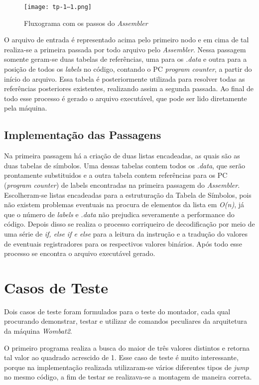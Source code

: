\documentclass{article}
\begin{document}
\begin{figure}[h!]
\centering
\texttt{[image: tp-1--1.png]}
\caption{Fluxograma com os passos do \textit{Assembler}}
\label{fig:trieExample}
\end{figure}

O arquivo de entrada é representado acima pelo primeiro nodo e em cima de tal realiza-se a primeira passada por todo arquivo pelo \textit{Assembler}. Nessa passagem somente geram-se duas tabelas de referências, uma para os \textit{.data} e outra para a posição de todos os \textit{labels} no código, contando o PC \textit{program counter}, a partir do início do arquivo. Essa tabela é posteriormente utilizada para resolver todas as referências posteriores existentes, realizando assim a segunda passada. Ao final de todo esse processo é gerado o arquivo executável, que pode ser lido diretamente pela máquina.

\subsection{Implementação das Passagens}
Na primeira passagem há a criação de duas listas encadeadas, as quais são as duas tabelas de símbolos. Uma dessas tabelas contem todos os \textit{.data}, que serão prontamente substituidos e a outra tabela contem referências para os PC (\textit{program counter}) de labels encontradas na primeira passagem do \textit{Assembler}. Escolheram-se listas encadeadas para a estruturação da Tabela de Símbolos, pois não existem problemas eventuais na procura de elementos da lista em \textit{O(n)}, já que o número de \textit{labels} e \textit{.data} não prejudica severamente a performance do código.
Depois disso se realiza o processo corriqueiro de decodificação por meio de uma série de \textit{if, else if e else} para a leitura da instrução e a tradução do valores de eventuais registradores para os respectivos valores binários. Após todo esse processo se encontra o arquivo executável gerado.

\section{Casos de Teste}

Dois casos de teste foram formulados para o teste do montador, cada qual procurando demonstrar, testar e utilizar de comandos peculiares da arquitetura da máquina \textit{Wombat2}. 

O primeiro programa realiza a busca do maior de três valores distintos e retorna tal valor ao quadrado acrescido de 1. Esse caso de teste é muito interessante, porque na implementação realizada utilizaram-se vários diferentes tipos de \textit{jump} no mesmo código, a fim de testar se realizava-se a montagem de maneira correta.
\end{document}
